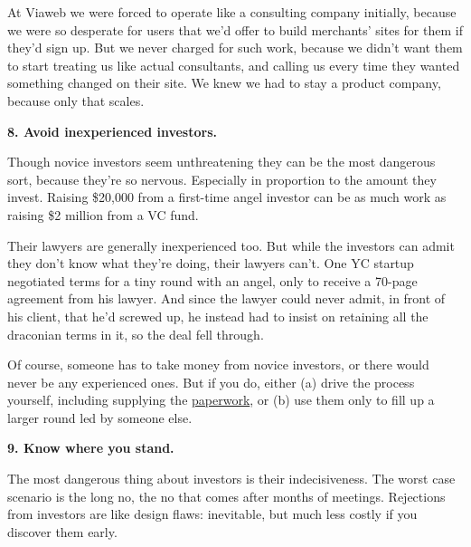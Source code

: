 At
                  Viaweb we were forced to operate like a consulting company
                  initially, because we were so desperate for users that we'd
                  offer to build merchants' sites for them if they'd sign up.
                  But we never charged for such work, because we didn't want
                  them to start treating us like actual consultants, and calling
                  us every time they wanted something changed on their site. We
                  knew we had to stay a product company, because only that
                  scales.


                  \textbf{8. Avoid inexperienced investors.}

Though
                  novice investors seem unthreatening they can be the most
                  dangerous sort, because they're so nervous. Especially in
                  proportion to the amount they invest. Raising \$20,000 from a
                  first-time angel investor can be as much work as raising \$2
                  million from a VC fund.

Their lawyers are generally
                  inexperienced too. But while the investors can admit they
                  don't know what they're doing, their lawyers can't. One YC
                  startup negotiated terms for a tiny round with an angel, only
                  to receive a 70-page agreement from his lawyer. And since the
                  lawyer could never admit, in front of his client, that he'd
                  screwed up, he instead had to insist on retaining all the
                  draconian terms in it, so the deal fell through.

Of
                  course, someone has to take money from novice investors, or
                  there would never be any experienced ones. But if you do,
                  either (a) drive the process yourself, including supplying the
                  \href{http://ycombinator.com/seriesaa.html}{paperwork},
                  or (b) use them only to fill up a larger round led by someone
                  else.


                  \textbf{9. Know where you stand.}

The most dangerous
                  thing about investors is their indecisiveness. The worst case
                  scenario is the long no, the no that comes after months of
                  meetings. Rejections from investors are like design flaws:
                  inevitable, but much less costly if you discover them
                  early.

